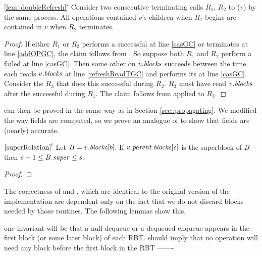 \begin{customlemma}{\ref{lem::doubleRefresh}$'$}\label{lem::doubleRefreshGC}
Consider two consecutive terminating calls $R_1$, $R_2$ to ($v$) by the same process.
All operations contained $v$'s children when $R_1$ begins
are contained in $v$ when $R_2$ terminates.
\end{customlemma}
\begin{proof}
If either $R_1$ or $R_2$ performs a successful  at line \ref{casGC} or terminates at line \ref{addOPGC}, the claim follows
from .
So suppose both $R_1$ and $R_2$ perform a failed  at line \ref{casGC}.
Then some other  on $v.\mbox{\textit{blocks}}$ succeeds between the time each 
reads $v.\mbox{\textit{blocks}}$ at line \ref{refreshReadTGC} and performs its  at line \ref{casGC}.
Consider the  $R_3$ that does this successful  during $R_2$.
$R_3$ must have read $v.\mbox{\textit{blocks}}$ after the successful  during $R_1$.
The claim follows from  applied to $R_3$.
\end{proof}

 can then be proved in the same way as in Section \ref{sec::propagating}.
We modified the way  fields are computed, so we prove an analogue of  to show that  fields are (nearly) accurate.

\begin{customlemma}{$\ref{superRelation}'$}\label{superRelationGC}
Let $B=v.\mbox{\textnormal{\textit{blocks}}}[b]$.
  If $v.\mbox{\textit{parent.blocks}}[s]$ is the superblock of $B$ then $s-1\leq B.\mbox{\textit{super}}\leq s$.
\end{customlemma}
\begin{proof}

\end{proof}



The correctness of  and , which are identical to the original version of the implementation are dependent only on the fact that we do not discard blocks needed by those routines.
The following lemmas show this.



one invariant will be that a null dequeue or a dequeued enqueue appears in the first block (or some later block) of each RBT.
should imply that no operation will need any block before the first block in the RBT
-------

